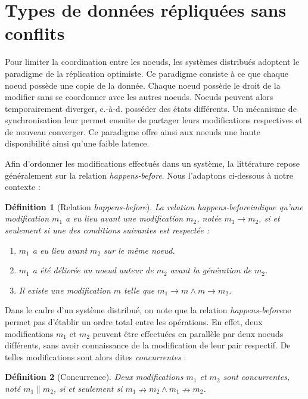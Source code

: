 \documentclass[12pt]{thesul}
\newtheorem{definition}{Définition}
\newcommand{\ie}{c.-à-d. }
\newcommand{\hb}{\emph{happens-before}}
\begin{document}


\section{Types de données répliquées sans conflits}

Pour limiter la coordination entre les noeuds, les systèmes distribués adoptent le paradigme de la réplication optimiste.
Ce paradigme consiste à ce que chaque noeud possède une copie de la donnée.
Chaque noeud possède le droit de la modifier sans se coordonner avec les autres noeuds.
Noeuds peuvent alors temporairement diverger, \ie posséder des états différents.
Un mécanisme de synchronisation leur permet ensuite de partager leurs modifications respectives et de nouveau converger.
Ce paradigme offre ainsi aux noeuds une haute disponibilité  ainsi qu'une faible latence.

Afin d'ordonner les modifications effectués dans un système, la littérature repose généralement sur la relation \hb \cite{1978-happen-before-lamport}.
Nous l'adaptons ci-dessous à notre contexte :

\begin{definition}[Relation \hb]
  La relation \hb indique qu'une modification $m_1$ a eu lieu avant une modification $m_2$, notée $m_1 \rightarrow m_2$, si et seulement si une des conditions suivantes est respectée :
  \begin{enumerate}[label=(\roman*)]
    \item $m_1$ a eu lieu avant $m_2$ sur le même noeud.
    \item $m_1$ a été délivrée au noeud auteur de $m_2$ avant la génération de $m_2$.
    \item Il existe une modification $m$ telle que $m_1 \rightarrow m \wedge m \rightarrow m_2$.
  \end{enumerate}
\end{definition}

Dans le cadre d'un système distribué, on note que la relation \hb ne permet pas d'établir un ordre total entre les opérations.
En effet, deux modifications $m_1$ et $m_2$ peuvent être effectuées en parallèle par deux noeuds différents, sans avoir connaissance de la modification de leur pair respectif.
De telles modifications sont alors dites \emph{concurrentes} :

\begin{definition}[Concurrence]
  Deux modifications $m_1$ et $m_2$ sont concurrentes, noté $m_1 \parallel m_2$, si et seulement si $m_1 \nrightarrow m_2 \wedge m_1 \nrightarrow m_2$.
\end{definition}
\end{document}
